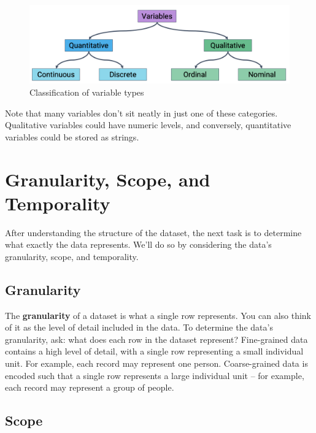 \documentclass[
  letterpaper,
  DIV=11,
  numbers=noendperiod]{scrreprt}
\begin{document}
\begin{figure}

{\centering \includegraphics{eda/images/variable.png}

}

\caption{Classification of variable types}

\end{figure}

Note that many variables don't sit neatly in just one of these
categories. Qualitative variables could have numeric levels, and
conversely, quantitative variables could be stored as strings.

\hypertarget{granularity-scope-and-temporality}{%
\section{Granularity, Scope, and
Temporality}\label{granularity-scope-and-temporality}}

After understanding the structure of the dataset, the next task is to
determine what exactly the data represents. We'll do so by considering
the data's granularity, scope, and temporality.

\hypertarget{granularity}{%
\subsection{Granularity}\label{granularity}}

The \textbf{granularity} of a dataset is what a single row represents.
You can also think of it as the level of detail included in the data. To
determine the data's granularity, ask: what does each row in the dataset
represent? Fine-grained data contains a high level of detail, with a
single row representing a small individual unit. For example, each
record may represent one person. Coarse-grained data is encoded such
that a single row represents a large individual unit -- for example,
each record may represent a group of people.

\hypertarget{scope}{%
\subsection{Scope}\label{scope}}
\end{document}
